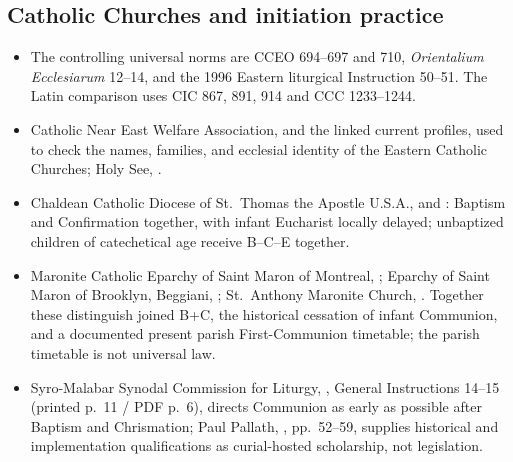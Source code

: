 \subsection*{Catholic Churches  and initiation practice}
{\footnotesize
\begin{itemize}[itemsep=0.18em,topsep=0.25em]
\item The controlling universal norms are CCEO 694--697 and 710, \emph{Orientalium Ecclesiarum} 12--14, and the 1996 Eastern liturgical Instruction 50--51. The Latin comparison uses CIC 867, 891, 914 and CCC 1233--1244.
\item Catholic Near East Welfare Association,  and the linked current profiles, used to check the names, families, and ecclesial identity of the Eastern Catholic Churches; Holy See, .
\item Chaldean Catholic Diocese of St.~Thomas the Apostle U.S.A.,  and : Baptism and Confirmation together, with infant Eucharist locally delayed; unbaptized children of catechetical age receive B--C--E together.
\item Maronite Catholic Eparchy of Saint Maron of Montreal, ; Eparchy of Saint Maron of Brooklyn, Beggiani, ; St.~Anthony Maronite Church, . Together these distinguish joined B+C, the historical cessation of infant Communion, and a documented present parish First-Communion timetable; the parish timetable is not universal law.
\item Syro-Malabar Synodal Commission for Liturgy, , General Instructions 14--15 (printed p.~11 / PDF p.~6), directs Communion as early as possible after Baptism and Chrismation; Paul Pallath, , pp.~52--59, supplies historical and implementation qualifications as curial-hosted scholarship, not legislation.

\end{itemize}}
